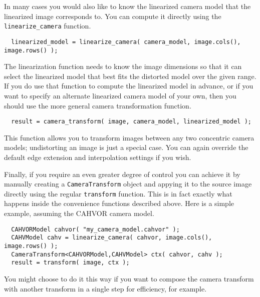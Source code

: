 In many cases you would also like to know the linearized camera model that the 
linearized image corresponds to.  You can compute it directly using the 
\verb#linearize_camera# function.
\begin{verbatim}
  linearized_model = linearize_camera( camera_model, image.cols(), image.rows() );
\end{verbatim}
The linearization function needs to know the image dimensions so that
it can select the linearized model that best fits the distorted model
over the given range.  If you do use that function to compute the
linearized model in advance, or if you want to specify an alternate
linearized camera model of your own, then you should use the more general 
camera transformation function.
\begin{verbatim}
  result = camera_transform( image, camera_model, linearized_model );
\end{verbatim}
This function allows you to transform images between any two concentric 
camera models; undistorting an image is just a special case.  You can again 
override the default edge extension and interpolation settings if you wish.

Finally, if you require an even greater degree of control you can
achieve it by manually creating a \verb#CameraTransform# object and
appying it to the source image directly using the regular
\verb#transform# function.  This is in fact exactly what happens inside 
the convenience functions described above.  Here is a simple example, 
assuming the CAHVOR camera model.
\begin{verbatim}
  CAHVORModel cahvor( "my_camera_model.cahvor" );
  CAHVModel cahv = linearize_camera( cahvor, image.cols(), image.rows() );
  CameraTransform<CAHVORModel,CAHVModel> ctx( cahvor, cahv );
  result = transform( image, ctx );
\end{verbatim}
You might choose to do it this way if you want to compose the camera
transform with another transform in a single step for efficiency, 
for example.
